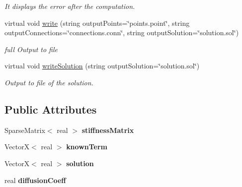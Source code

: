 \begin{DoxyCompactItemize}
\begin{DoxyCompactList}\small\item\em It displays the error after the computation. \end{DoxyCompactList}\item 
virtual void \hyperlink{class_problem_ad64a7baa630e90b51006b94d76c6943b}{write} (string output\+Points=\char`\"{}points.\+point\char`\"{}, string output\+Connections=\char`\"{}connections.\+conn\char`\"{}, string output\+Solution=\char`\"{}solution.\+sol\char`\"{})\hypertarget{class_problem_ad64a7baa630e90b51006b94d76c6943b}{}\label{class_problem_ad64a7baa630e90b51006b94d76c6943b}

\begin{DoxyCompactList}\small\item\em full Output to file \end{DoxyCompactList}\item 
virtual void \hyperlink{class_problem_a15f66edfd2d8672ed4941b65b03b9750}{write\+Solution} (string output\+Solution=\char`\"{}solution.\+sol\char`\"{})\hypertarget{class_problem_a15f66edfd2d8672ed4941b65b03b9750}{}\label{class_problem_a15f66edfd2d8672ed4941b65b03b9750}

\begin{DoxyCompactList}\small\item\em Output to file of the solution. \end{DoxyCompactList}\end{DoxyCompactItemize}
\subsection*{Public Attributes}
\begin{DoxyCompactItemize}
\item 
Sparse\+Matrix$<$ real $>$ {\bfseries stiffness\+Matrix}\hypertarget{class_problem_ace94c8d8501fde93725f41b0ebd34564}{}\label{class_problem_ace94c8d8501fde93725f41b0ebd34564}

\item 
VectorX$<$ real $>$ {\bfseries known\+Term}\hypertarget{class_problem_a5200b5adea61fcdfc73a1eec0d7074e3}{}\label{class_problem_a5200b5adea61fcdfc73a1eec0d7074e3}

\item 
VectorX$<$ real $>$ {\bfseries solution}\hypertarget{class_problem_a7ac15171e17c2468d35ff477d61b0a57}{}\label{class_problem_a7ac15171e17c2468d35ff477d61b0a57}

\item 
real {\bfseries diffusion\+Coeff}\hypertarget{class_problem_a54bfa04a25f5de579a6128ff871e0b01}{}\label{class_problem_a54bfa04a25f5de579a6128ff871e0b01}

\end{DoxyCompactItemize}
